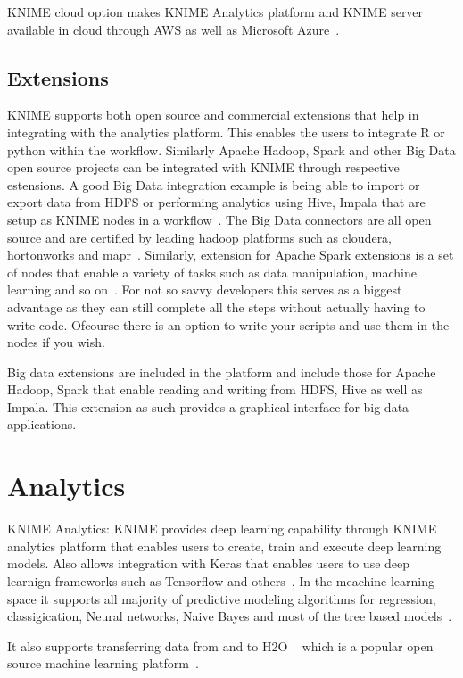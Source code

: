 KNIME cloud option makes KNIME Analytics platform and 
KNIME server available in cloud through AWS as well as 
Microsoft Azure~\cite{hid-sp18-517-cloud}. 

\subsection{Extensions}
KNIME supports both open source and commercial extensions that help 
in integrating with the analytics platform. This enables the users to integrate
R or python within the workflow. Similarly Apache Hadoop, Spark and other 
Big Data open source projects can be integrated with KNIME through respective 
estensions. A good Big Data integration example is being able to import or 
export data from HDFS or performing analytics using Hive, Impala that are
setup as KNIME nodes in a workflow~\cite{hid-sp18-517-ksw}. The Big Data
connectors are all open source and are certified by leading hadoop platforms
such as cloudera, hortonworks and mapr~\cite{hid-sp18-517-bde}. 
Similarly, extension for Apache Spark extensions is a set of nodes that enable 
a variety of tasks such as data manipulation, machine learning and so on~\cite{hid-sp18-517-spark}.
For not so savvy developers this serves as a biggest advantage as they can
still complete all the steps without actually having to write code. Ofcourse
there is an option to write your scripts and use them in the nodes if you wish.


Big data extensions are included in the platform and include those for
Apache Hadoop, Spark that enable reading and writing from HDFS, Hive
as well as Impala. This extension as such provides a graphical
interface for big data applications.

\section{Analytics}
KNIME Analytics: KNIME provides deep learning capability through KNIME
analytics platform that enables users to create, train and execute
deep learning models. Also allows integration with Keras that enables
users to use deep learnign frameworks such as Tensorflow and
others~\cite{hid-sp18-517-dl}. In the meachine learning space it
supports all majority of predictive modeling algorithms for
regression, classigication, Neural networks, Naive Bayes and most of
the tree based models~\cite{hid-sp18-517-pml}.

It also supports transferring data from and to H2O
~\cite{hid-sp18-517-h20} which is a popular open source machine
learning platform~\cite{hid-sp18-517-knimeh20}.

